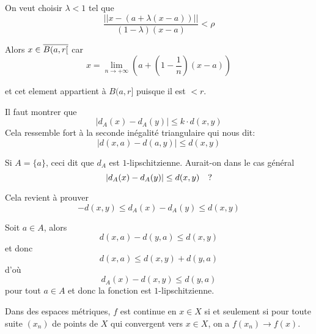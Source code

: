 \documentclass[french,a4paper,10pt]{article}
\begin{document}
\begin{td-sol}
\begin{enumerate}
            On veut choisir $\lambda<1$ tel que 
                \[
                    \frac{||x-(a+\lambda(x-a))||}{(1-\lambda)(x-a)}<\rho
                \]

            Alors $x\in \overline{B(a,r[}$ car
            \[
                x=\lim_{n\to+\infty}\left(a+\left(1-\frac1n\right)(x-a)\right)
            \]

            et cet element appartient à $B(a,r]$ puisque il est $<r$.
        \end{enumerate}
    \end{td-sol}

    \begin{td-sol}[4]
        Il faut montrer que 
        \[
            |d_A(x)-d_A(y)|\le k\cdot d(x,y)
        \]
        Cela ressemble fort à la seconde inégalité triangulaire qui nous dit:
        \[
            |d(x,a)-d(a,y)|\le d(x,y)
        \]

        Si $A=\{a\}$, ceci dit que $d_A$ est $1$-lipschitzienne. 
        Aurait-on dans le cas général
        \[
            |d_A(x)-d_A(y)|\le d(x,y)\quad\text ?
        \]

        Cela revient à prouver
        \[
            -d(x,y)\le d_A(x)-d_A(y)\le d(x,y)
        \]

        Soit $a\in A$, alors
        \[
            d(x,a)-d(y,a)\le d(x,y)
        \]
        et donc
        \[
            d(x,a)\le d(x,y)+d(y,a)
        \]
        d'où
        \[
            d_A(x)-d(x,y)\le d(y,a)
        \]
        pour tout $a\in A$ et donc la fonction est $1$-lipschitzienne.

        Dans des espaces métriques, $f$ est continue en $x\in X$ si et seulement si
        pour toute suite $(x_n)$ de points de $X$ qui convergent vers $x\in X$,
        on a $f(x_n)\to f(x)$.

    \end{td-sol}
\end{document}
